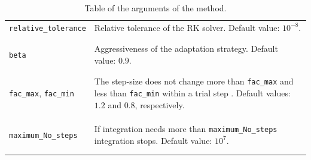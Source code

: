 \documentclass[11pt,a4paper]{article}
\begin{document}
\begin{table}[p]
\begin{tabular}{l l}
		{\tt relative\_tolerance} & \multirow{1}{12cm}{Relative tolerance of the RK solver.  Default value:  $10^{-8}$.}\\\\
		\hline\\[-0.4cm]
		
		{\tt beta} & \multirow{1}{12cm}{Aggressiveness of the adaptation strategy.  Default value:  $0.9$.}\\\\
		\hline\\[-0.4cm]

		{\tt fac\_max}, {\tt fac\_min} &\multirow{1}{12cm}{The step-size does not change more than {\tt fac\_max} and less than {\tt fac\_min} within a trial step . Default values: $1.2$ and $0.8$, respectively.} \\ \\ \\ 
		\hline\\[-0.4cm]
		
		{\tt maximum\_No\_steps} & \multirow{1}{12cm}{If integration needs more than {\tt maximum\_No\_steps} integration stops. Default value: $10^7$.}\\\\
		\hline\\[-0.4cm]
	\end{tabular}
	\caption{Table of the arguments of the  method.}
	\label{tab:solveNSC-input}
\end{table}
\end{document}
